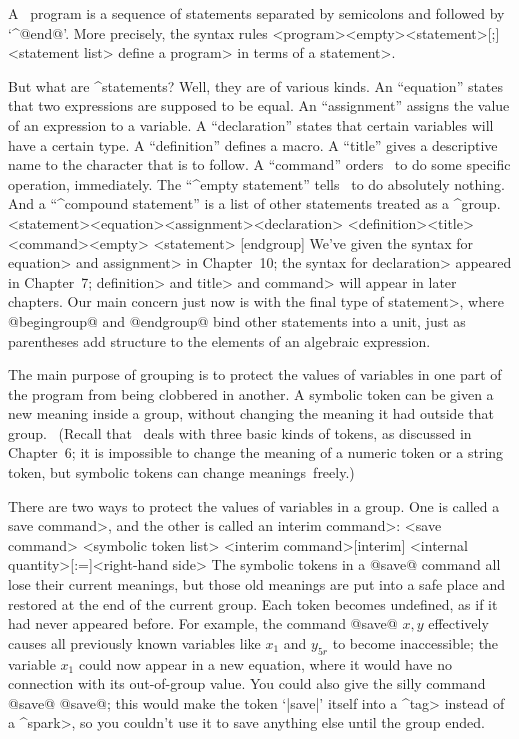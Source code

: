 {{{{A \MF\ program is a sequence of statements separated by semicolons and
followed by `^@end@'. More precisely, the syntax rules
\beginsyntax
<program>\is<empty>\alt<statement>[;]<statement list>
\endsyntax
define a \<program> in terms of a \<statement>.

But what are ^{statements}? Well, they are of various kinds. An ``equation''
states that two expressions are supposed to be equal. An ``assignment''
assigns the value of an expression to a variable. A ``declaration''
states that certain variables will have a certain type.
A ``definition'' defines a macro.  A ``title'' gives a descriptive name to
the character that is to follow.  A ``command'' orders \MF\ to do some
specific operation, immediately.  The ``^{empty statement}'' tells \MF\ to
do absolutely nothing.  And a ``^{compound statement}'' is a list of other
statements treated as a ^{group}.
\beginsyntax
<statement>\is<equation>\alt<assignment>\alt<declaration>
 \alt<definition>\alt<title>\alt<command>\alt<empty>
  <statement> [endgroup]
\endsyntax
We've given the syntax for \<equation> and \<assignment> in Chapter~10;
the syntax for \<declaration> appeared in Chapter~7; \<definition> and
\<title> and \<command> will appear in later chapters. Our main concern
just now is with the final type of \<statement>, where @begingroup@
and @endgroup@ bind other statements into a unit, just as parentheses
add structure to the elements of an algebraic expression.

The main purpose of grouping is to protect the values of variables in
one part of the program from being clobbered in another. A symbolic token
can be given a new meaning inside a group, without changing the
meaning it had outside that group. \ (Recall that \MF\ deals with
three basic kinds of tokens, as discussed in Chapter~6; it is impossible
to change the meaning of a numeric token or a string token, but
symbolic tokens can change meanings~freely.)

There are two ways to protect the values of variables in a group. One
is called a \<save command>, and the other is called an \<interim command>:
\beginsyntax
<save command>
<symbolic token list>
<interim command>\is\kern-1.5pt[interim]%
 <internal quantity>[:=]<right-hand side>\kern-1pt
\endsyntax
The symbolic tokens in a @save@ command all lose their current meanings, but
those old meanings are put into a safe place and restored at the end of
the current group. Each token becomes undefined, as if it had never
appeared before. For example, the command
\begindisplay
@save@ $x,y$
\enddisplay
effectively causes all previously known variables like $x_1$ and $y_{5r}$ to
become inaccessible; the variable $x_1$ could now appear in a new equation,
where it would have no connection with its out-of-group value. You could
also give the silly command
\begindisplay
@save@ @save@;
\enddisplay
this would make the token `|save|' itself into a ^\<tag> instead of a
^\<spark>, so you couldn't use it to save anything else until the group ended.

}}}}
